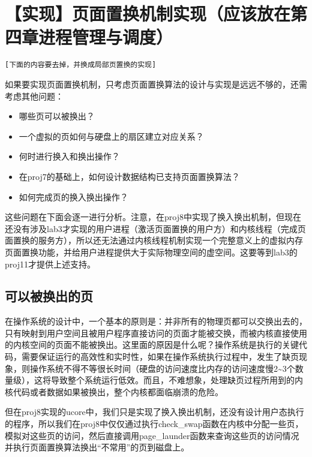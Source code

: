 \section{【实现】页面置换机制实现（应该放在第四章进程管理与调度）}\label{ux5b9eux73b0ux9875ux9762ux7f6eux6362ux673aux5236ux5b9eux73b0ux5e94ux8be5ux653eux5728ux7b2cux56dbux7ae0ux8fdbux7a0bux7ba1ux7406ux4e0eux8c03ux5ea6}

\lstinline![下面的内容要去掉，并换成局部页置换的实现]!

如果要实现页面置换机制，只考虑页面置换算法的设计与实现是远远不够的，还需考虑其他问题：

\begin{itemize}
\item
  哪些页可以被换出？
\item
  一个虚拟的页如何与硬盘上的扇区建立对应关系？
\item
  何时进行换入和换出操作？
\item
  在proj7的基础上，如何设计数据结构已支持页面置换算法？
\item
  如何完成页的换入换出操作？
\end{itemize}

这些问题在下面会逐一进行分析。注意，在proj8中实现了换入换出机制，但现在还没有涉及lab3才实现的用户进程（激活页面置换的用户方）和内核线程（完成页面置换的服务方），所以还无法通过内核线程机制实现一个完整意义上的虚拟内存页面置换功能，并给用户进程提供大于实际物理空间的虚空间。这要等到lab3的proj11才提供上述支持。

\subsection{可以被换出的页}\label{ux53efux4ee5ux88abux6362ux51faux7684ux9875}

在操作系统的设计中，一个基本的原则是：并非所有的物理页都可以交换出去的，只有映射到用户空间且被用户程序直接访问的页面才能被交换，而被内核直接使用的内核空间的页面不能被换出。这里面的原因是什么呢？操作系统是执行的关键代码，需要保证运行的高效性和实时性，如果在操作系统执行过程中，发生了缺页现象，则操作系统不得不等很长时间（硬盘的访问速度比内存的访问速度慢2\textasciitilde{}3个数量级），这将导致整个系统运行低效。而且，不难想象，处理缺页过程所用到的内核代码或者数据如果被换出，整个内核都面临崩溃的危险。

但在proj8实现的ucore中，我们只是实现了换入换出机制，还没有设计用户态执行的程序，所以我们在proj8中仅仅通过执行check\_swap函数在内核中分配一些页，模拟对这些页的访问，然后直接调用page\_launder函数来查询这些页的访问情况并执行页面置换算法换出``不常用''的页到磁盘上。

